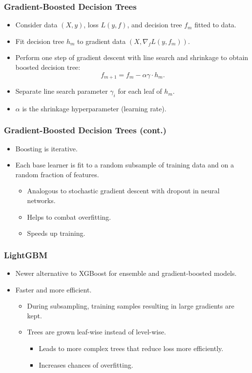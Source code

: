 \documentclass{beamer}
\begin{document}
\begin{frame}
\frametitle{Gradient-Boosted Decision Trees}
\begin{itemize}
\item Consider data $(X, y)$, loss $L(y, f)$, and decision tree $f_m$ fitted to data.
\item Fit decision tree $h_m$ to gradient data $(X, \nabla_f L(y, f_m))$.
\item Perform one step of gradient descent with line search and shrinkage to obtain boosted decision tree:
\[ f_{m+1} = f_m - \alpha\gamma\cdot h_m. \]
\item Separate line search parameter $\gamma_i$ for each leaf of $h_m$.
\item $\alpha$ is the shrinkage hyperparameter (learning rate).
\end{itemize}
\end{frame}

\begin{frame}
\frametitle{Gradient-Boosted Decision Trees (cont.)}
\begin{itemize}
\item Boosting is iterative.
\item Each base learner is fit to a random subsample of training data and on a random fraction of features.
\begin{itemize}
\item Analogous to stochastic gradient descent with dropout in neural networks.
\item Helps to combat overfitting.
\item Speeds up training.
\end{itemize}
\end{itemize}
\end{frame}

\begin{frame}
\frametitle{LightGBM}
\begin{itemize}
\item Newer alternative to XGBoost for ensemble and gradient-boosted models.
\item Faster and more efficient.
\begin{itemize}
\item During subsampling, training samples resulting in large gradients are kept.
\item Trees are grown leaf-wise instead of level-wise.
\begin{itemize}
\item Leads to more complex trees that reduce loss more efficiently.
\item Increases chances of overfitting.
\end{itemize}
\end{itemize}
\end{itemize}
\end{frame}
\end{document}
